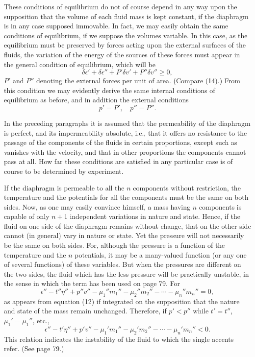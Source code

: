 \documentclass[11pt]{article}
\begin{document}
These conditions of equilibrium do not of course depend in any way upon the supposition that the volume of each fluid mass is kept constant, if the diaphragm is in any case supposed immovable. In fact, we may easily obtain the same conditions of equilibrium, if we suppose the volumes variable. In this case, as the equilibrium must be preserved by forces acting upon the external surfaces of the fluids, the variation of the energy of the sources of these forces must appear in the general condition of equilibrium, which will be
\begin{equation}
\delta\epsilon'+\delta\epsilon''+P'\delta v'+P''\delta v''\geq 0,
\end{equation}
\(P'\) and \(P''\) denoting the external forces per unit of area. (Compare (14).) From this condition we may evidently derive the same internal conditions of equilibrium as before, and in addition the external conditions
\begin{equation}
p'=P',\quad p''=P''.
\end{equation}

In the preceding paragraphs it is assumed that the permeability of the diaphragm is perfect, and its impermeability absolute, i.e., that it offers no resistance to the passage of the components of the fluids in certain proportions, except such as vanishes with the velocity, and that in other proportions the components cannot pass at all. How far these conditions are satisfied in any particular case is of course to be determined by experiment.

If the diaphragm is permeable to all the \(n\) components without restriction, the temperature and the potentials for all the components must be the same on both sides. Now, as one may easily convince himself, a mass having \(n\) components is capable of only \(n+1\) independent variations in nature and state. Hence, if the fluid on one side of the diaphragm remains without change, that on the other side cannot (in general) vary in nature or state. Yet the pressure will not necessarily be the same on both sides. For, although the pressure is a function of the temperature and the \(n\) potentials, it may be a many-valued function (or any one of several functions) of these variables. But when the pressures are different on the two sides, the fluid which has the less pressure will be practically unstable, in the sense in which the term has been used on page 79. For
\begin{equation}
\epsilon''-t''\eta''+p''v''-
\mu_1''m_1''-\mu_2''m_2''-\cdots-\mu_n''m_n''=0,
\end{equation}
as appears from equation (12) if integrated on the supposition that the nature and state of the mass remain unchanged. Therefore, if \(p'<p''\) while \(t'=t''\), \(\mu_1'=\mu_1''\), etc.,
\begin{equation}
\epsilon''-t'\eta''+p'v''-
\mu_1'm_1''-\mu_2'm_2''-\cdots-\mu_n'm_n''<0.
\end{equation}
This relation indicates the instability of the fluid to which the single accents refer. (See page 79.)
\end{document}
